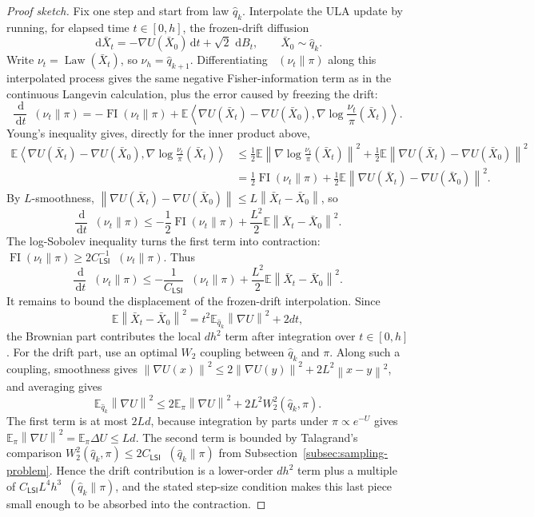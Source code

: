 \documentclass{amsart}
\numberwithin{equation}{section}
\theoremstyle{plain}
\theoremstyle{definition}
\theoremstyle{remark}
\DeclareMathOperator{\KL}{D_{\mathsf{KL}}}
\DeclareMathOperator{\FI}{FI}
\DeclareMathOperator{\Law}{Law}
\newcommand{\E}{\mathbb{E}}
\newcommand{\dd}{\,\mathrm{d}}
\newcommand{\wh}[1]{\widehat{#1}}
\newcommand{\norm}[1]{\left\lVert #1 \right\rVert}
\newcommand{\ip}[2]{\left\langle #1,#2 \right\rangle}
\begin{document}
\begin{proof}[Proof sketch]
Fix one step and start from law $\wh q_k$.  Interpolate the ULA update by
running, for elapsed time $t\in[0,h]$, the frozen-drift diffusion
\[
    \dd \bar X_t=-\nabla U(\bar X_0)\dd t+\sqrt2\,\dd B_t,
    \qquad \bar X_0\sim \wh q_k.
\]
Write $\nu_t=\Law(\bar X_t)$, so $\nu_h=\wh q_{k+1}$.  Differentiating
$\KL(\nu_t\|\pi)$ along this interpolated process gives the same negative
Fisher-information term as in the continuous Langevin calculation, plus the
error caused by freezing the drift:
\[
    \frac{\dd}{\dd t}\KL(\nu_t\|\pi)
    =
    -\FI(\nu_t\|\pi)
    +
    \E\ip{\nabla U(\bar X_t)-\nabla U(\bar X_0)}
    {\nabla\log \frac{\nu_t}{\pi}(\bar X_t)}.
\]
Young's inequality gives, directly for the inner product above,
\begin{align*}
    \E\ip{\nabla U(\bar X_t)-\nabla U(\bar X_0)}
    {\nabla\log \frac{\nu_t}{\pi}(\bar X_t)}
    &\leq
    \frac12\E\norm{\nabla\log \frac{\nu_t}{\pi}(\bar X_t)}^2
    +
    \frac12\E\norm{\nabla U(\bar X_t)-\nabla U(\bar X_0)}^2 \\
    &=
    \frac12\FI(\nu_t\|\pi)
    +
    \frac12\E\norm{\nabla U(\bar X_t)-\nabla U(\bar X_0)}^2.
\end{align*}
By $L$-smoothness,
$\norm{\nabla U(\bar X_t)-\nabla U(\bar X_0)}
\leq L\norm{\bar X_t-\bar X_0}$, so
\[
    \frac{\dd}{\dd t}\KL(\nu_t\|\pi)
    \leq
    -\frac12\FI(\nu_t\|\pi)
    +
    \frac{L^2}{2}\E\norm{\bar X_t-\bar X_0}^2.
\]
The log-Sobolev inequality turns the first term into contraction:
$\FI(\nu_t\|\pi)\geq 2C_{\mathsf{LSI}}^{-1}\KL(\nu_t\|\pi)$.  Thus
\[
    \frac{\dd}{\dd t}\KL(\nu_t\|\pi)
    \leq
    -\frac{1}{C_{\mathsf{LSI}}}\KL(\nu_t\|\pi)
    +
    \frac{L^2}{2}\E\norm{\bar X_t-\bar X_0}^2.
\]
It remains to bound the displacement of the frozen-drift interpolation.  Since
\[
    \E\norm{\bar X_t-\bar X_0}^2
    =
    t^2\E_{\wh q_k}\norm{\nabla U}^2+2dt,
\]
the Brownian part contributes the local $d h^2$ term after integration over
$t\in[0,h]$.  For the drift part, use an optimal $W_2$ coupling between
$\wh q_k$ and $\pi$.  Along such a coupling, smoothness gives
$\norm{\nabla U(x)}^2\leq
2\norm{\nabla U(y)}^2+2L^2\norm{x-y}^2$, and averaging gives
\[
    \E_{\wh q_k}\norm{\nabla U}^2
    \leq
    2\E_\pi\norm{\nabla U}^2+2L^2W_2^2(\wh q_k,\pi).
\]
The first term is at most $2Ld$, because integration by parts under
$\pi\propto e^{-U}$ gives
$\E_\pi\norm{\nabla U}^2=\E_\pi\Delta U\leq Ld$.  The second term is bounded by
Talagrand's comparison
$W_2^2(\wh q_k,\pi)\leq 2C_{\mathsf{LSI}}\KL(\wh q_k\|\pi)$ from
Subsection~\ref{subsec:sampling-problem}.  Hence the drift contribution is a
lower-order $d h^2$ term plus a multiple of
$C_{\mathsf{LSI}}L^4h^3\KL(\wh q_k\|\pi)$, and the stated step-size condition
makes this last piece small enough to be absorbed into the contraction.


\end{proof}
\end{document}
